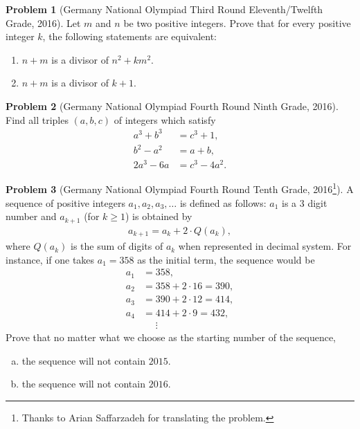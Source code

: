 \documentclass[]{article}
\theoremstyle{definition}
\newtheorem{problem}{Problem}
\begin{document}
\begin{problem}[Germany National Olympiad Third Round Eleventh/Twelfth Grade, 2016]
	Let $m$ and $n$ be two positive integers. Prove that for every positive integer $k$, the following statements are equivalent:
		\begin{enumerate}
			\item $n+m$ is a divisor of $n^2+km^2$.
			\item $n+m$ is a divisor of $k+1$.
		\end{enumerate}
\end{problem}




\begin{problem}[Germany National Olympiad Fourth Round Ninth Grade, 2016]
	Find all triples $(a, b, c)$ of integers which satisfy
		\begin{align*}
			a^3 + b^3 &= c^3 + 1,\\
			b^2 - a^2 &= a + b,\\
			2a^3-6a   &= c^3 - 4a^2.
		\end{align*}
\end{problem}


\begin{problem}[Germany National Olympiad Fourth Round Tenth Grade, 2016\footnote{Thanks to Arian Saffarzadeh for translating the problem.}]
	A sequence of positive integers $a_1, a_2, a_3, \dots$ is defined as follows: $a_1$ is a $3$ digit number and $a_{k+1}$ (for $k \geq 1$) is obtained by
		\begin{align*}
			a_{k+1} = a_k + 2 \cdot Q(a_k),
		\end{align*}
	where $Q(a_k)$ is the sum of digits of $a_k$ when represented in decimal system. For instance, if one takes $a_1 = 358$ as the initial term, the sequence would be
		\begin{align*}
			a_1 &= 358,\\
			a_2 &= 358 + 2 \cdot 16 = 390,\\
			a_3 &= 390+ 2 \cdot 12 = 414,\\
			a_4 &= 414 + 2 \cdot 9 = 432,\\
			 &\phantom{=}\vdots
		\end{align*}
	Prove that no matter what we choose as the starting number of the sequence,
	\begin{enumerate}[(a)]
		\item the sequence will not contain $2015$.
		\item the sequence will not contain $2016$.		
	\end{enumerate}
\end{problem}
\end{document}
